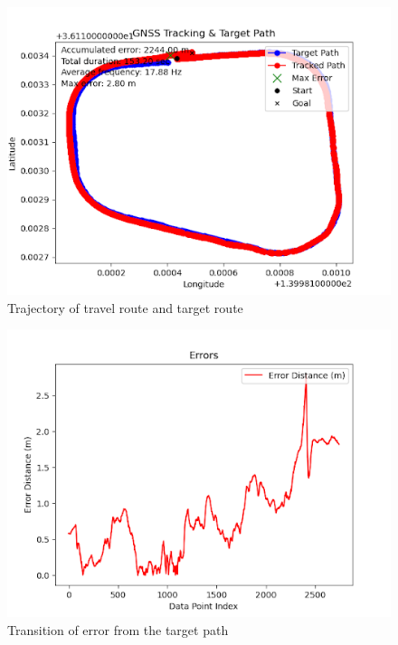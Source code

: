 \begin{figure}[H]
     \centering
    \includegraphics[keepaspectratio, scale=0.7]
         {images/3mspath.png}
    \caption{Trajectory of travel route and target route}
    \label{fig:path}
\end{figure}

\begin{figure}[H]
     \centering
    \includegraphics[keepaspectratio, scale=0.7]
         {images/3mserror.png}
    \caption{Transition of error from the target path}
    \label{fig:path}
\end{figure}

